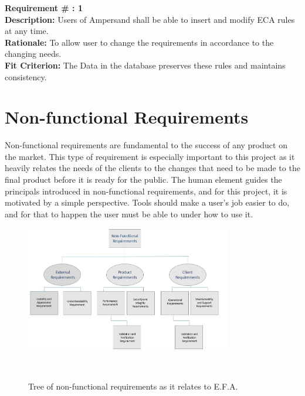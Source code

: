 \documentclass[12pt]{report}
\begin{document}
\textbf{Requirement \# : 1}
 \\
  \textbf{Description:} Users of Ampersand shall be able to insert and 
modify ECA rules at any time. \\
  \textbf{Rationale:} To allow user to change the requirements in accordance to the changing needs. \\
  \textbf{Fit Criterion:} The Data in the database preserves these rules and maintains consistency. \\


\chapter{Non-functional Requirements}\label{ch:NonFunc}
Non-functional requirements are fundamental to the success of any product on the market. This type 
of requirement is especially important to this project as it heavily relates the needs of the 
clients to the changes that need to be made to the final product before it is ready for the public. 
The human element guides the principals introduced in non-functional requirements, and for this 
project, it is motivated by a simple perspective. Tools should make a user’s job easier to do, and 
for that to happen the user must be able to under how to use it. 
\begin{figure}[!htb]
	\centering
	\includegraphics[width=0.8\textwidth]{../figures/NONFUNCTIONAL}
	\caption{Tree of non-functional requirements as it relates to E.F.A.}~\label{fig:figure2}
\end{figure}
\end{document}
